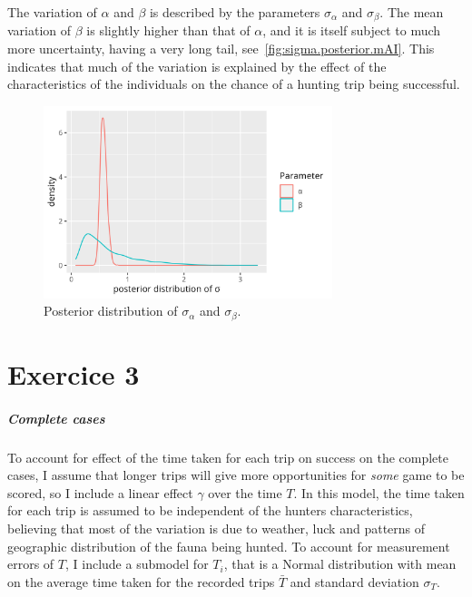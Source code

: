 \documentclass[article, a4paper, 12pt]{memoir}
\begin{document}
The variation of $\alpha$ and $\beta$ is described by the parameters $\sigma_\alpha$ and $\sigma_\beta$.
The mean variation of $\beta$ is slightly higher than that of $\alpha$, and it is itself subject to much more uncertainty, having a very long tail, see~\autoref{fig:sigma.posterior.mAI}.
This indicates that much of the variation is explained by the effect of the characteristics of the individuals on the chance of a hunting trip being successful.

\begin{figure}[htb!]
\begin{center}
    \includegraphics[width=0.75\textwidth]{./plots/sigma.posterior.mAI.png}
\end{center}
\caption{Posterior distribution of $\sigma_\alpha$ and $\sigma_\beta$.}\label{fig:sigma.posterior.mAI}
\end{figure}

\chapter*{Exercice 3}

\paragraph*{Complete cases}
To account for effect of the time taken for each trip on success on the complete cases, I assume that longer trips will give more opportunities for \emph{some} game to be scored, so I include a linear effect $\gamma$ over the time $T$.
In this model, the time taken for each trip is assumed to be independent of the hunters characteristics, believing that most of the variation is due to weather, luck and patterns of geographic distribution of the fauna being hunted.
To account for measurement errors of $T$, I include a submodel for $T_i$, that is a Normal distribution with mean on the average time taken for the recorded trips $\bar{T}$ and standard deviation $\sigma_T$.
\end{document}
